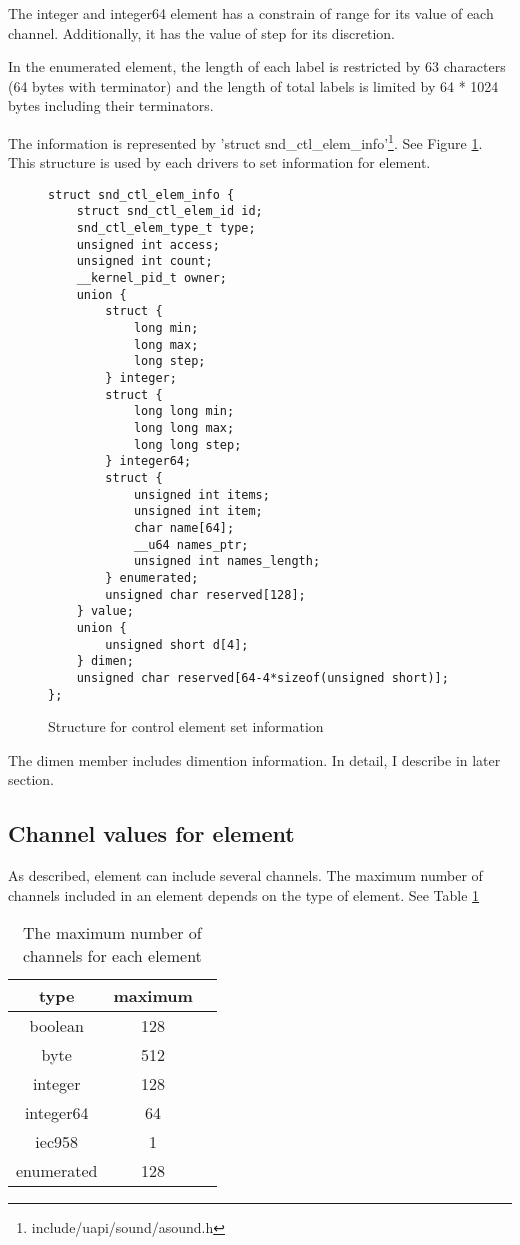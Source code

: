 \documentclass[onecolumn]{article}
\begin{document}
The integer and integer64 element has a constrain of range for its value of each channel. Additionally, it has the value of step for its discretion.

In the enumerated element, the length of each label is restricted by 63 characters (64 bytes with terminator) and the length of total labels is limited by 64 * 1024 bytes including their terminators.

The information is represented by 'struct snd\_ctl\_elem\_info'\footnote{include/uapi/sound/asound.h}. See Figure \ref{fig:element-set-info-structure}. This structure is used by each drivers to set information for element.

\begin{figure}[htbp]
\small
\begin{verbatim}
struct snd_ctl_elem_info {
    struct snd_ctl_elem_id id;
    snd_ctl_elem_type_t type;
    unsigned int access;
    unsigned int count;
    __kernel_pid_t owner;
    union {
        struct {
            long min;
            long max;
            long step;
        } integer;
        struct {
            long long min;
            long long max;
            long long step;
        } integer64;
        struct {
            unsigned int items;
            unsigned int item;
            char name[64];
            __u64 names_ptr;
            unsigned int names_length;
        } enumerated;
        unsigned char reserved[128];
    } value;
    union {
        unsigned short d[4];
    } dimen;
    unsigned char reserved[64-4*sizeof(unsigned short)];
};
\end{verbatim}
\caption{{Structure for control element set information}}
\label{fig:element-set-info-structure}
\end{figure}

The dimen member includes dimention information. In detail, I describe in later section.

\subsection{Channel values for element}

As described, element can include several channels. The maximum number of channels included in an element depends on the type of element. See Table \ref{tbl:max-channels}

\begin{table}[H]
        \centering
        \caption{{The maximum number of channels for each element}}
        \label{tbl:max-channels}
        \begin{tabular}{ccc} \toprule
		type & maximum \\ \midrule
		boolean & 128 \\
		byte & 512 \\
		integer & 128 \\
		integer64 & 64 \\
		iec958 & 1 \\
		enumerated & 128 \\ \bottomrule
        \end{tabular}
\end{table}
\end{document}
